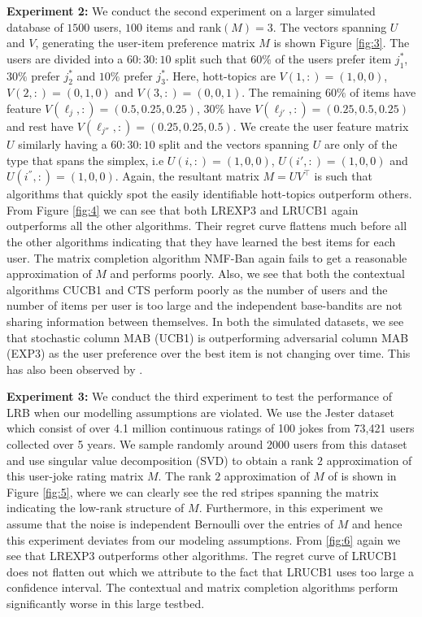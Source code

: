 \textbf{Experiment 2:} We conduct the second experiment on a larger simulated database of $1500$ users, $100$ items and rank$(M)=3$. The vectors spanning $U$ and $V$, generating the user-item preference matrix $M$ is shown Figure \ref{fig:3}. The users are divided into a $60:30:10$ split such that $60\%$ of the users prefer item $j^*_1$, $30\%$ prefer $j^*_2$ and $10\%$ prefer $j_3^*$.  Here, hott-topics are $V(1,:) = (1,0,0)$, $V(2,:) = (0,1, 0)$ and $V(3,:) = (0,0,1)$. The remaining $60\%$ of items have feature  $V(\ell_{j},:) = (0.5, 0.25,0.25)$, $30\%$ have $V(\ell_{j'},:) = (0.25, 0.5, 0.25)$ and rest have $V(\ell_{j''},:) = (0.25, 0.25, 0.5)$. We create the user feature matrix $U$ similarly having a $60:30:10$ split and the vectors spanning $U$ are only of the type that spans the simplex, i.e $U(i,:)=(1,0,0)$, $U(i',:)=(1,0,0)$ and $U(i^{''},:)=(1,0,0)$. Again, the resultant matrix $M =UV^{\intercal}$ is such that algorithms that quickly spot the easily identifiable hott-topics outperform others. From Figure \ref{fig:4} we can see that both LREXP3 and LRUCB1 again outperforms all the other algorithms. Their regret curve flattens much before all the other algorithms indicating that they have learned the best items for each user. The matrix completion algorithm NMF-Ban again fails to get a reasonable approximation of $M$ and performs poorly. Also, we see that both the contextual algorithms CUCB1 and CTS perform poorly as the number of users and the number of items per user is too large and the independent base-bandits are not sharing information between themselves. In both the simulated datasets, we see that stochastic column MAB (UCB1) is outperforming adversarial column MAB (EXP3) as the user preference over the best item is not changing over time. This has also been observed by \citet{radlinski2008learning}.


\textbf{Experiment 3:} We conduct the third experiment to test the performance of LRB when our modelling assumptions are violated. We use the Jester dataset \citep{goldberg2001eigentaste} which consist of over 4.1 million continuous ratings of 100 jokes from 73,421 users collected over 5 years. We sample randomly around 2000 users from this dataset and use singular value decomposition (SVD) to obtain a rank $2$ approximation of this user-joke rating matrix $M$. The rank $2$ approximation of $M$ of  is shown in Figure \ref{fig:5}, where we can clearly see the red stripes spanning the matrix indicating the low-rank structure of $M$. Furthermore, in this experiment we assume that the noise is independent Bernoulli over the entries of $M$ and hence this experiment deviates from our modeling assumptions. From \ref{fig:6} again we see that LREXP3 outperforms other algorithms. The regret curve of LRUCB1 does not flatten out which we attribute to the fact that LRUCB1 uses too large a confidence interval. The contextual and matrix completion algorithms perform significantly worse in this large testbed.



